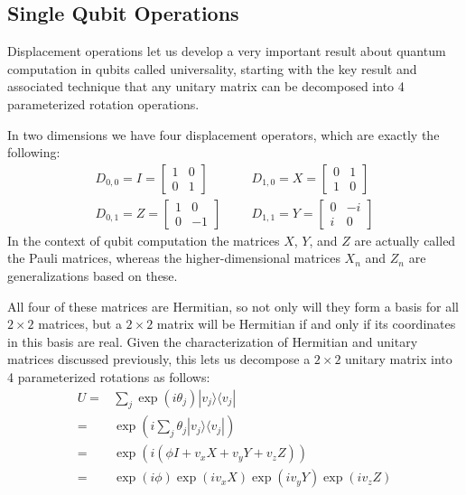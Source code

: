 \documentclass[]{article}
\newcommand{\bra}[1]{\langle #1 |}
\newcommand{\ket}[1]{| #1 \rangle}
\begin{document}
\subsection{Single Qubit Operations}

Displacement operations let us develop a very important result about quantum computation in qubits called universality, starting with the key result and associated technique that any unitary matrix can be decomposed into 4 parameterized rotation operations.

In two dimensions we have four displacement operators, which are exactly the following:
\begin{align*}
D_{0,0}=I=\left[\begin{matrix}
1&0\\
0&1
\end{matrix}\right]
&&&
D_{1,0}=X=\left[\begin{matrix}
0&1\\
1&0
\end{matrix}\right]
\\
D_{0,1}=Z=\left[\begin{matrix}
1&0\\
0&-1
\end{matrix}\right]
&&&
D_{1,1}=Y=\left[\begin{matrix}
0&-i\\
i&0
\end{matrix}\right]
\end{align*}
In the context of qubit computation the matrices $X$, $Y$, and $Z$ are actually called the Pauli matrices, whereas the higher-dimensional matrices $X_n$ and $Z_n$ are generalizations based on these.

All four of these matrices are Hermitian, so not only will they form a basis for all $2\times2$ matrices, but a $2\times2$ matrix will be Hermitian if and only if its coordinates in this basis are real. Given the characterization of Hermitian and unitary matrices discussed previously, this lets us decompose a $2\times2$ unitary matrix into 4 parameterized rotations as follows:
\begin{align*}
U
=& \sum_j \exp(i\theta_j)\ket{v_j}\bra{v_j}
\\=& \exp\left(i\sum_j \theta_j\ket{v_j}\bra{v_j}\right)
\\=& \exp\left(i(\phi I + v_xX+v_yY+v_zZ)\right)
\\=& \exp\left(i\phi\right)\exp(iv_xX)\exp(iv_yY)\exp(iv_zZ)
\end{align*}
\end{document}
